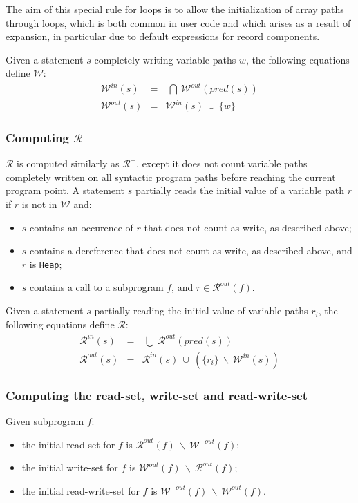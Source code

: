 \documentclass{article}
\newcommand{\code}[1]{\texttt{#1}}
\newcommand{\heap}{\code{Heap}\xspace}
\newcommand{\pred}[1]{\ensuremath{\mathit{pred}(#1)}\xspace}
\newcommand{\outallwrites}[1]{\ensuremath{\mathcal{W}^{+out}(#1)}\xspace}
\newcommand{\writes}{$\mathcal{W}$\xspace}
\newcommand{\inwrites}[1]{\ensuremath{\mathcal{W}^{in}(#1)}\xspace}
\newcommand{\outwrites}[1]{\ensuremath{\mathcal{W}^{out}(#1)}\xspace}
\newcommand{\allreads}{$\mathcal{R^+}$\xspace}
\newcommand{\reads}{$\mathcal{R}$\xspace}
\newcommand{\inreads}[1]{\ensuremath{\mathcal{R}^{in}(#1)}\xspace}
\newcommand{\outreads}[1]{\ensuremath{\mathcal{R}^{out}(#1)}\xspace}
\newcommand{\union}{~\cup~}
\newcommand{\bigunion}{~\bigcup~}
\newcommand{\biginter}{~\bigcap~}
\newcommand{\minus}{~\backslash~}
\begin{document}
The aim of this special rule for loops is to allow the initialization of array
paths through loops, which is both common in user code and which arises as a
result of expansion, in particular due to default expressions for record
components.

Given a statement $s$ completely writing variable paths $w$, the following
equations define \writes:
\begin{eqnarray*}
\inwrites{s} &=& \biginter \outwrites{\pred{s}}\\
\outwrites{s} &=& \inwrites{s} \union \{w\}
\end{eqnarray*}

\subsubsection{Computing \reads}

\reads is computed similarly as \allreads, except it does not count variable
paths completely written on all syntactic program paths before reaching the
current program point. A statement $s$ partially reads the initial value of a
variable path $r$ if $r$ is not in \writes and:
\begin{itemize}
\item $s$ contains an occurence of $r$ that does not count as write, as
  described above;
\item $s$ contains a dereference that does not count as write, as described
  above, and $r$ is \heap;
\item $s$ contains a call to a subprogram $f$, and $r \in \outreads{f}$.
\end{itemize}

Given a statement $s$ partially reading the initial value of variable paths
$r_i$, the following equations define \reads:
\begin{eqnarray*}
\inreads{s} &=& \bigunion \outreads{\pred{s}}\\
\outreads{s} &=& \inreads{s} \union (\{r_i\} \minus \inwrites{s})
\end{eqnarray*}

\subsubsection{Computing the read-set, write-set and read-write-set}

Given subprogram $f$:
\begin{itemize}
\item the initial read-set for $f$ is $\outreads{f} \minus \outallwrites{f}$;
\item the initial write-set for $f$ is $\outwrites{f} \minus \outreads{f}$;
\item the initial read-write-set for $f$ is $\outallwrites{f} \minus
  \outwrites{f}$.
\end{itemize}
\end{document}
